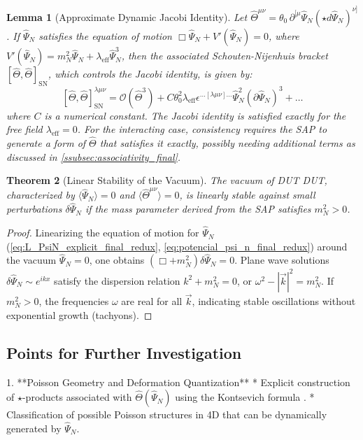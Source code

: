 \documentclass[11pt, a4paper]{article}
\newtheorem{theorem}{Theorem}[section]
\newtheorem{lemma}[theorem]{Lemma} %
\theoremstyle{remark}
\newcommand{\Op}[1]{\hat{#1}}
\begin{document}
\begin{lemma}[Approximate Dynamic Jacobi Identity]
\label{apendice:lema_jacobi}
Let \( \Op{\Theta}^{\mu\nu} = \theta_0 \, \partial^{[\mu} \Op{\Psi}_N (\star d\Op{\Psi}_N)^{\nu]} \). If \( \Op{\Psi}_N \) satisfies the equation of motion \( \Box \Op{\Psi}_N + V'(\Op{\Psi}_N) = 0 \), where \( V'(\Op{\Psi}_N) = m_N^2 \Op{\Psi}_N + \lambda_{\text{eff}} \Op{\Psi}_N^3 \), then the associated Schouten-Nijenhuis bracket \( [\Op{\Theta}, \Op{\Theta}]_{\text{SN}} \), which controls the Jacobi identity, is given by:
\[
[\Op{\Theta}, \Op{\Theta}]_{\text{SN}}^{\lambda\mu\nu} = \mathcal{O}(\Op{\Theta}^3) + C \theta_0^2 \lambda_{\text{eff}} \epsilon^{\dots[\lambda\mu\nu]\dots} \Op{\Psi}_N^2 (\partial \Op{\Psi}_N)^3 + \dots
\]
where \( C \) is a numerical constant. The Jacobi identity is satisfied exactly for the free field \( \lambda_{\text{eff}} = 0 \). For the interacting case, consistency requires the SAP to generate a form of \( \Op{\Theta} \) that satisfies it exactly, possibly needing additional terms as discussed in \cref{ssubsec:associativity_final}.
\end{lemma}

\begin{theorem}[Linear Stability of the Vacuum]
\label{teo:estabilidad_vacio}
The vacuum of DUT DUT, characterized by \( \langle \Op{\Psi}_N \rangle = 0 \) and \( \langle \Op{\Theta}^{\mu\nu} \rangle = 0 \), is linearly stable against small perturbations \( \delta \Op{\Psi}_N \) if the mass parameter derived from the SAP satisfies \( m_N^2 > 0 \).
\end{theorem}
\begin{proof}[Proof]
Linearizing the equation of motion for \( \Op{\Psi}_N \) (\cref{eq:L_PsiN_explicit_final_redux}, \cref{eq:potencial_psi_n_final_redux}) around the vacuum \( \Op{\Psi}_N = 0 \), one obtains \( (\Box + m_N^2)\delta \Op{\Psi}_N = 0 \). Plane wave solutions \( \delta \Op{\Psi}_N \sim e^{ikx} \) satisfy the dispersion relation \( k^2 + m_N^2 = 0 \), or \( \omega^2 - |\vec{k}|^2 = m_N^2 \). If \( m_N^2 > 0 \), the frequencies \( \omega \) are real for all \( \vec{k} \), indicating stable oscillations without exponential growth (tachyons).
\end{proof}

\subsection{Points for Further Investigation}

1.  **Poisson Geometry and Deformation Quantization**
    * Explicit construction of \( \star \)-products associated with \( \Op{\Theta}(\Op{\Psi}_N) \) using the Kontsevich formula \citep{Kontsevich2003Deformation}.
    * Classification of possible Poisson structures in 4D that can be dynamically generated by \( \Op{\Psi}_N \).
\end{document}
